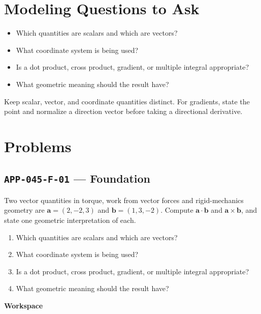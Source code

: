 \documentclass[11pt]{book}
\newcommand{\pid}[1]{\texttt{#1}}
\newcommand{\workspace}{\par\vspace{0.7in}\hrulefill\par\vspace{0.55in}\hrulefill\par}
\begin{document}
\section*{Modeling Questions to Ask}\begin{itemize}
\item Which quantities are scalars and which are vectors?
\item What coordinate system is being used?
\item Is a dot product, cross product, gradient, or multiple integral appropriate?
\item What geometric meaning should the result have?
\end{itemize}
\begin{errorbox}Keep scalar, vector, and coordinate quantities distinct. For gradients, state the point and normalize a direction vector before taking a directional derivative.\end{errorbox}
\section*{Problems}
\subsection*{\pid{APP-045-F-01} — Foundation}
\begin{problembox}
Two vector quantities in torque, work from vector forces and rigid-mechanics geometry are $\mathbf a=(2,-2,3)$ and $\mathbf b=(1,3,-2)$. Compute $\mathbf a\cdot\mathbf b$ and $\mathbf a\times\mathbf b$, and state one geometric interpretation of each.
\end{problembox}
\begin{promptbox}\begin{enumerate}
\item Which quantities are scalars and which are vectors?
\item What coordinate system is being used?
\item Is a dot product, cross product, gradient, or multiple integral appropriate?
\item What geometric meaning should the result have?
\end{enumerate}\end{promptbox}
\textbf{Workspace}\workspace
{}
\end{document}

